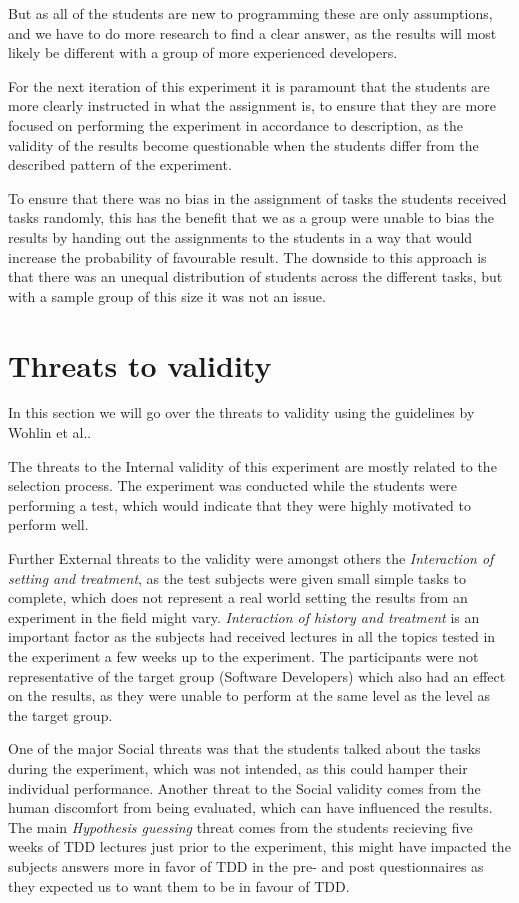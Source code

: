 \documentclass{sig-alternate-05-2015}
\begin{document}
But as all of the students are new to programming these are only assumptions, and we have to do more research to find a clear answer, as the results will most likely be different with a group of more experienced developers.

For the next iteration of this experiment it is paramount that the students are more clearly instructed in what the assignment is, to ensure that they are more focused on performing the experiment in accordance to description, as the validity of the results become questionable when the students differ from the described pattern of the experiment. 

To ensure that there was no bias in the assignment of tasks the students received tasks randomly, this has the benefit that we as a group were unable to bias the results by handing out the assignments to the students in a way that would increase the probability of favourable result. The downside to this approach is that there was an unequal distribution of students across the different tasks, but with a sample group of this size it was not an issue.


\section{Threats to validity}
In this section we will go over the threats to validity using the guidelines by Wohlin et al.\cite{wohlin1}.

The threats to the Internal validity of this experiment are mostly related to the selection process. The experiment was conducted while the students were performing a test, which would indicate that they were highly motivated to perform well.

Further External threats to the validity were amongst others the \textit{Interaction of setting and treatment}, as the test subjects were given small simple tasks to complete, which does not represent a real world setting the results from an experiment in the field might vary. \textit{Interaction of history and treatment} is an important factor as the subjects had received lectures in all the topics tested in the experiment a few weeks up to the experiment. The participants were not representative of the target group (Software Developers) which also had an effect on the results, as they were unable to perform at the same level as the level as the target group.

One of the major Social threats was that the students talked about the tasks during the experiment, which was not intended, as this could hamper their individual performance. Another threat to the Social validity comes from the human discomfort from being evaluated\cite{henchy1}, which can have influenced the results. The main \textit{Hypothesis guessing} threat comes from the students recieving five  weeks of TDD lectures just prior to the experiment, this might have impacted the subjects answers more in favor of TDD in the pre- and post questionnaires as they expected us to want them to be in favour of TDD. 
\end{document}
